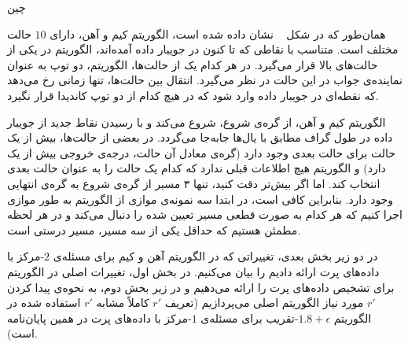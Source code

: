 ‌چین

همان‌طور که در شکل ~ نشان داده شده است، الگوریتم کیم و آهن، دارای $10$ حالت مختلف است.
متناسب با نقاطی که تا کنون در جویبار داده آمده‌اند، الگوریتم در یکی از حالت‌های بالا قرار می‌گیرد.
در هر کدام یک از حالت‌ها، الگوریتم، دو توپ به عنوان نماینده‌ی جواب در این حالت در نظر می‌گیرد.
انتقال بین حالت‌ها، تنها زمانی رخ می‌دهد که نقطه‌ای در جویبار داده وارد شود که در هیچ کدام از دو توپ کاندیدا قرار نگیرد.

الگوریتم کیم و آهن، از گره‌ی شروع، شروع می‌کند و با رسیدن نقاط جدید از جویبار داده در طول گراف مطابق با یال‌ها جابه‌جا می‌گردد.
در بعضی از حالت‌ها، بیش از یک حالت برای حالت بعدی وجود دارد (گره‌ی معادل آن حالت، درجه‌ی خروجی بیش از یک دارد) و الگوریتم هیچ اطلاعات قبلی ندارد که کدام یک حالت را به عنوان حالت بعدی انتخاب کند.
اما اگر بیش‌تر دقت کنید، تنها ۳ مسیر از گره‌ی شروع به گره‌ی انتهایی وجود دارد.
بنابراین کافی است، در ابتدا سه نمونه‌ی موازی از الگوریتم به طور موازی اجرا کنیم که هر کدام به صورت قطعی مسیر تعیین شده را دنبال می‌کند و در هر لحظه مطمئن هستیم که حداقل یکی از سه مسیر، مسیر درستی است.

در دو زیر بخش بعدی، تغییراتی که در الگوریتم آهن و کیم برای مسئله‌ی $2$-مرکز با داده‌های پرت ارائه دادیم را بیان می‌کنیم.
در بخش اول، تغییرات اصلی در الگوریتم برای تشخیص داده‌های پرت را ارائه می‌دهیم و در زیر بخش دوم، به نحوه‌ی پیدا کردن $r'$ مورد نیاز الگوریتم اصلی می‌پردازیم (تعریف $r'$ کاملاً مشابه $r'$ استفاده شده در الگوریتم $1.8 + \epsilon$-تقریب برای مسئله‌ی $1$-مرکز با داده‌های پرت در همین پایان‌نامه است).

